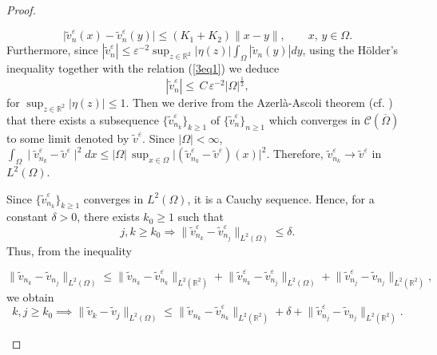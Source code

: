 \documentclass[11pt]{article}
\begin{document}
\begin{proof}
\begin{enumerate}
		\begin{equation}\label{3eq6}
			\lvert \tilde{v}_{n}^{\varepsilon}(x) - \tilde{v}_{n}^{\varepsilon}(y) \rvert \leq (K_1 +K_2) \lVert x-y \rVert ,\qquad  x,\,y \in \Omega.
		\end{equation}
		Furthermore, {since $\left| \tilde{v}_{n}^{\varepsilon}  \right| \leq\varepsilon^{-2}\sup_{z \in \mathbb{R}^2}|\eta(z)|\int_{\Omega}|\tilde{v}_{n}(y)|dy$, using the H\"older's inequality together with the relation (\ref{3eq1}) we deduce}
		$$\left| \tilde{v}_{n}^{\varepsilon}  \right| \leq \, C \,  \varepsilon^{-2}  |\Omega|^{\frac{1}{2}},$$
		for {$\sup_{z \in \mathbb{R}^2}|\eta(z)|\leq 1$}. Then we derive from the  Azerl\`a-Ascoli theorem  (cf. \cite[Theorem 1.33]{RA1}) that there exists a subsequence {$\{\tilde{v}_{n_k}^{\varepsilon}\}_{k \geq 1}$ of $\{\tilde{v}_{n}^{\varepsilon}\}_{n \geq 1}$} which converges in $\mathcal{C}(\overline{\Omega})$ to some limit denoted by $\tilde{v}^{\varepsilon}$.
		Since $\lvert \Omega\rvert< \infty$, 
		$ \int_{\Omega} \mid \tilde{v}_{n_k}^{\varepsilon}-\tilde{v}^{\varepsilon} \mid^{2} dx \leq  |\Omega|\, \sup_{x \in \Omega}\lvert\left( \tilde{v}_{n_k}^{\varepsilon}-\tilde{v}^{\varepsilon}\right)(x) \rvert^{2} $.
		Therefore, $ \tilde{v}_{n_k}^{\varepsilon} \longrightarrow \tilde{v}^{\varepsilon}$ in $L^2(\Omega)$. 
		
		Since $\{\tilde{v}_{n_k}^{\varepsilon}\}_{k \geq 1}$ converges in $L^2(\Omega)$, it is a Cauchy sequence. Hence, for a constant $\delta>0$, there exists {$k_0 \geq 1$} such that $$j,k\geq k_0\Rightarrow \lVert \tilde{v}_{n_k}^{\varepsilon}-\tilde{v}_{n_j}^{\varepsilon}\rVert_{L^2(\Omega)} \leq \delta.$$
		Thus, from the inequality 
		
			\begin{equation*}
			\lVert\tilde{v}_{n_k} - \tilde{v}_{n_j}\rVert_{L^2(\Omega)}\leq \lVert \tilde{v}_{n_k}-\tilde{v}_{n_k}^{\varepsilon}\rVert_{L^2(\mathbb{R}^2)} +  \lVert \tilde{v}_{n_k}^{\varepsilon}-\tilde{v}_{n_j}^{\varepsilon}\rVert_{L^2(\Omega)} + \lVert \tilde{v}_{n_j}^{\varepsilon}-\tilde{v}_{n_j}\rVert_{L^2(\mathbb{R}^2)},
		\end{equation*}
		we obtain
		\begin{equation}\label{3eq8}
			k,j\geq k_0 \implies \lVert\tilde{v}_{k} -\tilde{v}_{j} \rVert_{L^2(\Omega)} \leq  \lVert \tilde{v}_{n_k}-\tilde{v}_{n_k}^{\varepsilon}\rVert_{L^2(\mathbb{R}^2)} +\delta  +  \lVert \tilde{v}_{n_j}^{\varepsilon}-\tilde{v}_{n_j}\rVert_{L^2(\mathbb{R}^2)}.
		\end{equation}
		

\end{enumerate}
\end{proof}
\end{document}
